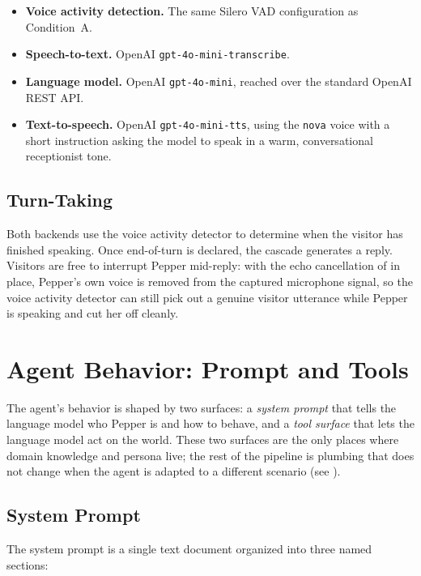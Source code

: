\begin{itemize}
    \item \textbf{Voice activity detection.} The same Silero VAD configuration as Condition~A.
    \item \textbf{Speech-to-text.} OpenAI \texttt{gpt-4o-mini-transcribe}.
    \item \textbf{Language model.} OpenAI \texttt{gpt-4o-mini}, reached over the standard OpenAI REST API.
    \item \textbf{Text-to-speech.} OpenAI \texttt{gpt-4o-mini-tts}, using the \texttt{nova} voice with a short instruction asking the model to speak in a warm, conversational receptionist tone.
\end{itemize}


\subsection{Turn-Taking}
\label{sec:turn_taking}

Both backends use the voice activity detector to determine when the visitor has finished speaking.
Once end-of-turn is declared, the cascade generates a reply.
Visitors are free to interrupt Pepper mid-reply: with the echo cancellation of  in place, Pepper's own voice is removed from the captured microphone signal, so the voice activity detector can still pick out a genuine visitor utterance while Pepper is speaking and cut her off cleanly.


\section{Agent Behavior: Prompt and Tools}
\label{sec:knowledge}

The agent's behavior is shaped by two surfaces: a \emph{system prompt} that tells the language model who Pepper is and how to behave, and a \emph{tool surface} that lets the language model act on the world.
These two surfaces are the only places where domain knowledge and persona live; the rest of the pipeline is plumbing that does not change when the agent is adapted to a different scenario (see ).

\subsection{System Prompt}
\label{sec:system_prompt}

The system prompt is a single text document organized into three named sections:

